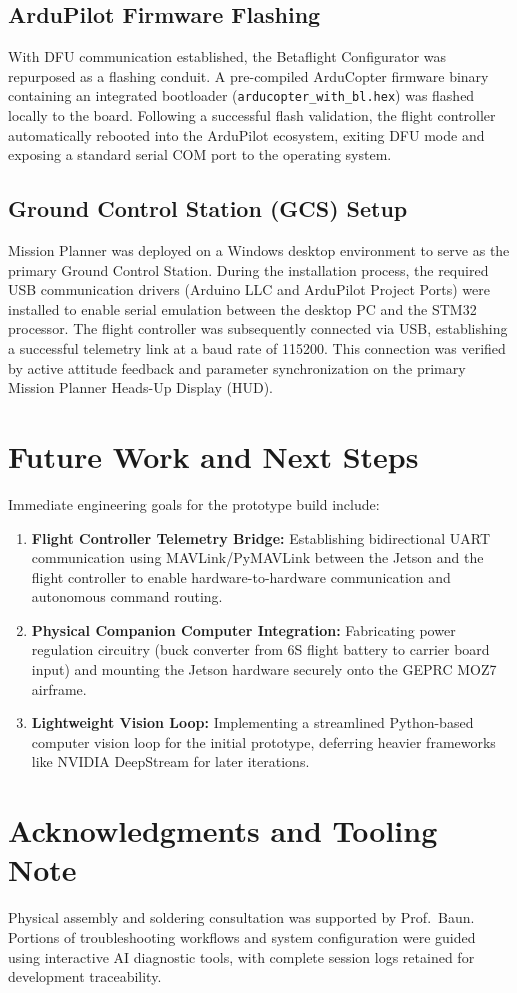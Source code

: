 \documentclass[11pt,a4paper]{article}
\begin{document}
\subsection{ArduPilot Firmware Flashing}
With DFU communication established, the Betaflight Configurator was repurposed as a flashing conduit. A pre-compiled ArduCopter firmware binary containing an integrated bootloader (\texttt{arducopter\_with\_bl.hex}) was flashed locally to the board. Following a successful flash validation, the flight controller automatically rebooted into the ArduPilot ecosystem, exiting DFU mode and exposing a standard serial COM port to the operating system.

\subsection{Ground Control Station (GCS) Setup}
Mission Planner was deployed on a Windows desktop environment to serve as the primary Ground Control Station. During the installation process, the required USB communication drivers (Arduino LLC and ArduPilot Project Ports) were installed to enable serial emulation between the desktop PC and the STM32 processor. The flight controller was subsequently connected via USB, establishing a successful telemetry link at a baud rate of 115200. This connection was verified by active attitude feedback and parameter synchronization on the primary Mission Planner Heads-Up Display (HUD).

\section{Future Work and Next Steps} 
Immediate engineering goals for the prototype build include: 
\begin{enumerate}
    \item \textbf{Flight Controller Telemetry Bridge:} Establishing bidirectional UART communication using MAVLink/PyMAVLink between the Jetson and the flight controller to enable hardware-to-hardware communication and autonomous command routing.
    \item \textbf{Physical Companion Computer Integration:} Fabricating power regulation circuitry (buck converter from 6S flight battery to carrier board input) and mounting the Jetson hardware securely onto the GEPRC MOZ7 airframe.
    \item \textbf{Lightweight Vision Loop:} Implementing a streamlined Python-based computer vision loop for the initial prototype, deferring heavier frameworks like NVIDIA DeepStream for later iterations.
\end{enumerate}

\section*{Acknowledgments and Tooling Note} 
Physical assembly and soldering consultation was supported by Prof.~Baun. Portions of troubleshooting workflows and system configuration were guided using interactive AI diagnostic tools, with complete session logs retained for development traceability.
\end{document}
